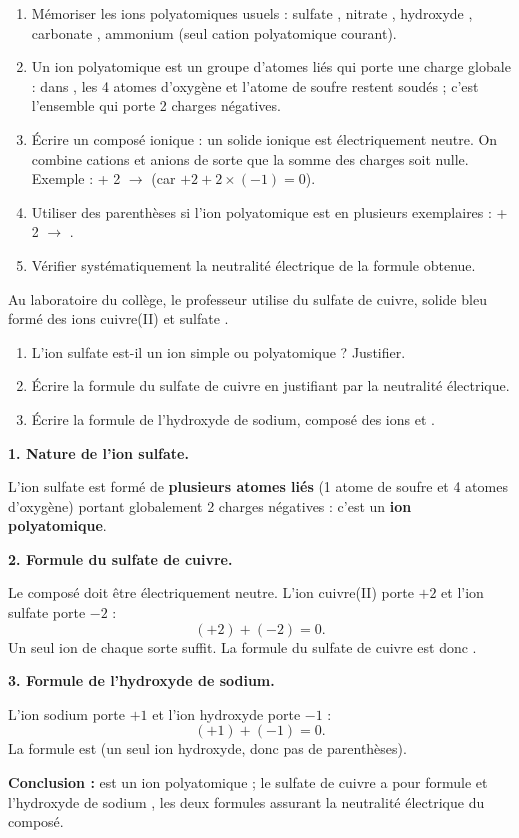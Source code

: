 \documentclass[11pt]{article}
\newcommand{\cle}[1]{{\popxbold\color{popdark}#1}}
\begin{document}
\begin{methode}
\begin{enumerate}
\item \cle{Mémoriser les ions polyatomiques usuels} : sulfate , nitrate , hydroxyde , carbonate , ammonium  (seul cation polyatomique courant).
\item \cle{Un ion polyatomique est un groupe d'atomes liés} qui porte une charge globale : dans , les 4 atomes d'oxygène et l'atome de soufre restent soudés ; c'est l'ensemble qui porte 2 charges négatives.
\item \cle{Écrire un composé ionique} : un solide ionique est électriquement neutre. On combine cations et anions de sorte que la somme des charges soit nulle. Exemple :  + 2  $\rightarrow$  (car $+2 + 2 \times (-1) = 0$).
\item \cle{Utiliser des parenthèses} si l'ion polyatomique est en plusieurs exemplaires :  + 2  $\rightarrow$ .
\item \cle{Vérifier systématiquement} la neutralité électrique de la formule obtenue.
\end{enumerate}
\end{methode}

\begin{exoresolu}
Au laboratoire du collège, le professeur utilise du sulfate de cuivre, solide bleu formé des ions cuivre(II)  et sulfate .
\begin{enumerate}
\item L'ion sulfate est-il un ion simple ou polyatomique ? Justifier.
\item Écrire la formule du sulfate de cuivre en justifiant par la neutralité électrique.
\item Écrire la formule de l'hydroxyde de sodium, composé des ions  et .
\end{enumerate}
\tcblower
\textbf{1. Nature de l'ion sulfate.}

L'ion sulfate  est formé de \textbf{plusieurs atomes liés} (1 atome de soufre et 4 atomes d'oxygène) portant globalement 2 charges négatives : c'est un \textbf{ion polyatomique}.

\textbf{2. Formule du sulfate de cuivre.}

Le composé doit être électriquement neutre. L'ion cuivre(II) porte $+2$ et l'ion sulfate porte $-2$ :
\[ (+2) + (-2) = 0. \]
Un seul ion de chaque sorte suffit. La formule du sulfate de cuivre est donc .

\textbf{3. Formule de l'hydroxyde de sodium.}

L'ion sodium porte $+1$ et l'ion hydroxyde porte $-1$ :
\[ (+1) + (-1) = 0. \]
La formule est  (un seul ion hydroxyde, donc pas de parenthèses).

\textbf{Conclusion :}  est un ion polyatomique ; le sulfate de cuivre a pour formule  et l'hydroxyde de sodium , les deux formules assurant la neutralité électrique du composé.
\end{exoresolu}
\end{document}
